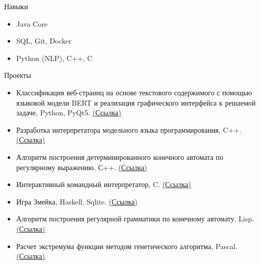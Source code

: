 \documentclass{resume} %
\begin{document}
\begin{rSection}{Навыки}
\begin{itemize}
  \item Java Core
  \item SQL, Git, Docker
  \item Python (NLP), C++, C
\end{itemize}
\end{rSection}



\begin{rSection}{Проекты}
\begin{itemize}
\item {Классификация веб-страниц на основе текстового содержимого с помощью языковой модели BERT и реализация графического интерфейса к решаемой задаче, Python, PyQt5. \href{https://github.com/tymillnyc/diploma} {\underline {(Ссылка)}}}
\item {Разработка интерпретатора модельного языка программирования, C++. \href{https://github.com/tymillnyc/PLInterpreter} {\underline {(Ссылка)}}}
\item {Алгоритм построения детерминированного конечного автомата по регулярному выражению, С++. \href{https://github.com/tymillnyc/re2dfa} {\underline {(Ссылка)}}} 
\item {Интерактивный командный интерпретатор, C. \href{https://github.com/tymillnyc/myshell} {\underline {(Ссылка)}}} 
\item {Игра \textquotedbl{}Змейка\textquotedbl{}, Haskell, Sqlite. \href{https://github.com/tymillnyc/chervyak} {\underline {(Ссылка)}}} 
\item {Алгоритм построения регулярной грамматики по конечному автомату, Lisp. \href{https://github.com/tymillnyc/dfa2reggram} {\underline {(Ссылка)}}} 
\item {Расчет экстремума функции методом генетического алгоритма, Pascal. \href{https://github.com/tymillnyc/GeneticAlgorithm} {\underline {(Ссылка)}}} 
\end{itemize}
\end{rSection} 





\end{document}
